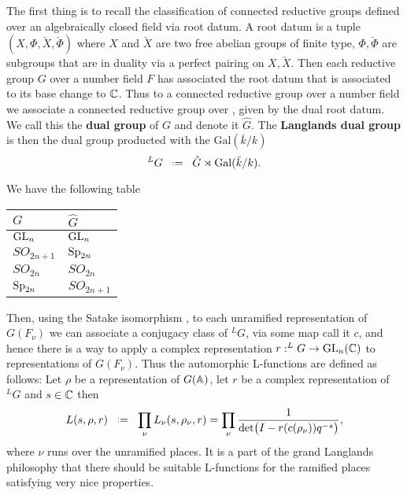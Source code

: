 The first thing is to recall the classification of connected reductive groups defined over an algebraically closed field via root datum. A root datum is a tuple \((X, \Phi, \check{X} , \check{\Phi})\) where \(X\) and \(\check{X}\) are two free abelian groups of finite type, \(\Phi, \check{\Phi}\) are subgroups that are in duality via a perfect pairing on \(X, \check{X}\). Then each reductive group \(G\) over a number field \(F\) has associated the root datum that is associated to its base change to \(\C\). Thus to a connected reductive group over a number field we associate a connected reductive group over \C, given by the dual root datum. We call this the \textbf{dual group} of \(G\) and denote it \(\hat{G}\). The \textbf{Langlands dual group} is then the dual group producted with the \(\mathrm{Gal}(\bar{k}/k)\)
\[^L G \defeq \hat{G} \rtimes \mathrm{Gal}(\bar{k}/k).\]

\begin{example}
    We have the following table
    \begin{table}[h]
        \centering
        \begin{tabular}{ll}
        \(G\)         & \(\hat{G}\)   \\ \hline
        \(\operatorname{GL}_n\)     & \(\operatorname{GL}_n\)     \\
        \(SO_{2n+1}\) & \(\operatorname{Sp}_{2n}\)  \\
        \(SO_{2n}\)   & \(SO_{2n}\)   \\
        \(\operatorname{Sp}_{2n}\)  & \(SO_{2n+1}\)
        \end{tabular}
        \end{table}
\end{example}

Then, using the Satake isomorphism \cite[2.2]{shahidiEisensteinSeriesAutomorphic2010}, to each unramified representation of \(G(F_\nu)\) we can associate a conjugacy class of \(^LG\), via some map call it \(c\), and hence there is a way to apply a complex representation \(r: ^LG \to \GL_n(\C)\) to representations of \(G(F_\nu)\). Thus the automorphic L-functions are defined as follows: Let \(\rho\) be a representation of \(G(\A)\), let \(r\) be a complex representation of \(^LG\) and \(s\in \C\) then 
\[L(s, \rho, r) \defeq \prod_\nu L_\nu(s, \rho_\nu, r ) = \prod_\nu \frac{1}{\det\bigl( I - r(c(\rho_\nu))q^{-s} \bigr)}  ,\]
where \(\nu\) runs over the unramified places. It is a part of the grand Langlands philosophy that there should be suitable L-functions for the ramified places satisfying very nice properties.

